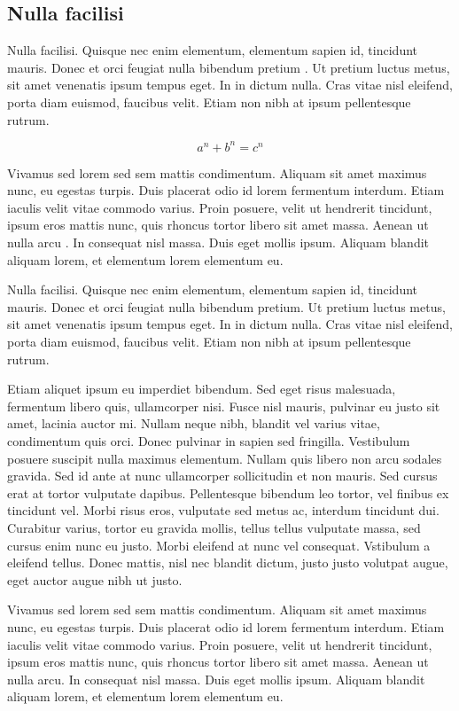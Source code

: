 \documentclass{luagost-7-32}
\begin{document}
\subsection{Nulla facilisi}

Nulla facilisi.
Quisque nec enim elementum, elementum sapien id, tincidunt mauris.
Donec et orci feugiat nulla bibendum pretium \cite{bib:bernstein-poly-eval}.
Ut pretium luctus metus, sit amet venenatis ipsum tempus eget.
In in dictum nulla.
Cras vitae nisl eleifend, porta diam euismod, faucibus velit.
Etiam non nibh at ipsum pellentesque rutrum.

\begin{equation}
    a^n + b^n = c^n
\end{equation}

Vivamus sed lorem sed sem mattis condimentum.
Aliquam sit amet maximus nunc, eu egestas turpis.
Duis placerat odio id lorem fermentum interdum.
Etiam iaculis velit vitae commodo varius.
Proin posuere, velit ut hendrerit tincidunt, ipsum eros mattis nunc, quis rhoncus tortor libero sit amet massa.
Aenean ut nulla arcu \cite{bib:filevault-analysis}.
In consequat nisl massa.
Duis eget mollis ipsum.
Aliquam blandit aliquam lorem, et elementum lorem elementum eu.

\newpage
\conclusion

Nulla facilisi.
Quisque nec enim elementum, elementum sapien id, tincidunt mauris.
Donec et orci feugiat nulla bibendum pretium.
Ut pretium luctus metus, sit amet venenatis ipsum tempus eget.
In in dictum nulla.
Cras vitae nisl eleifend, porta diam euismod, faucibus velit.
Etiam non nibh at ipsum pellentesque rutrum.

Etiam aliquet ipsum eu imperdiet bibendum.
Sed eget risus malesuada, fermentum libero quis, ullamcorper nisi.
Fusce nisl mauris, pulvinar eu justo sit amet, lacinia auctor mi.
Nullam neque nibh, blandit vel varius vitae, condimentum quis orci.
Donec pulvinar in sapien sed fringilla.
Vestibulum posuere suscipit nulla maximus elementum.
Nullam quis libero non arcu sodales gravida.
Sed id ante at nunc ullamcorper sollicitudin et non mauris.
Sed cursus erat at tortor vulputate dapibus.
Pellentesque bibendum leo tortor, vel finibus ex tincidunt vel.
Morbi risus eros, vulputate sed metus ac, interdum tincidunt dui.
Curabitur varius, tortor eu gravida mollis, tellus tellus vulputate massa, sed cursus enim nunc eu justo.
Morbi eleifend at nunc vel consequat.
Vstibulum a eleifend tellus.
Donec mattis, nisl nec blandit dictum, justo justo volutpat augue, eget auctor augue nibh ut justo.

\newpage
{}

Vivamus sed lorem sed sem mattis condimentum.
Aliquam sit amet maximus nunc, eu egestas turpis.
Duis placerat odio id lorem fermentum interdum.
Etiam iaculis velit vitae commodo varius.
Proin posuere, velit ut hendrerit tincidunt, ipsum eros mattis nunc, quis rhoncus tortor libero sit amet massa.
Aenean ut nulla arcu.
In consequat nisl massa.
Duis eget mollis ipsum.
Aliquam blandit aliquam lorem, et elementum lorem elementum eu.

\newpage
{}


\end{document}
